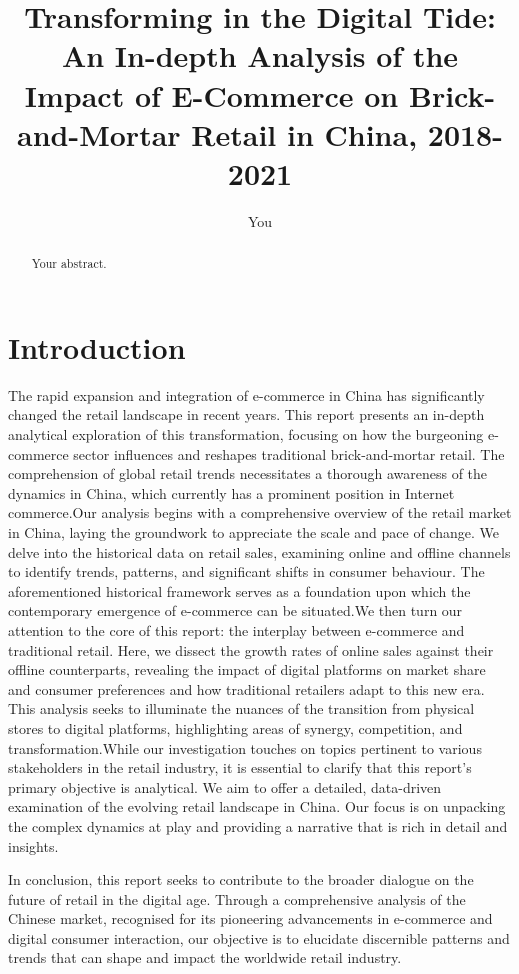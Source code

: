 \documentclass{article}
\title{Transforming in the Digital Tide: An In-depth Analysis of the Impact of E-Commerce on Brick-and-Mortar Retail in China, 2018-2021}
\author{You}
\begin{document}
\maketitle

\begin{abstract}
Your abstract.
\end{abstract}

\section{Introduction}
The rapid expansion and integration of e-commerce in China has significantly changed the retail landscape in recent years. This report presents an in-depth analytical exploration of this transformation, focusing on how the burgeoning e-commerce sector influences and reshapes traditional brick-and-mortar retail. The comprehension of global retail trends necessitates a thorough awareness of the dynamics in China, which currently has a prominent position in Internet commerce.Our analysis begins with a comprehensive overview of the retail market in China, laying the groundwork to appreciate the scale and pace of change. We delve into the historical data on retail sales, examining online and offline channels to identify trends, patterns, and significant shifts in consumer behaviour. The aforementioned historical framework serves as a foundation upon which the contemporary emergence of e-commerce can be situated.We then turn our attention to the core of this report: the interplay between e-commerce and traditional retail. Here, we dissect the growth rates of online sales against their offline counterparts, revealing the impact of digital platforms on market share and consumer preferences and how traditional retailers adapt to this new era. This analysis seeks to illuminate the nuances of the transition from physical stores to digital platforms, highlighting areas of synergy, competition, and transformation.While our investigation touches on topics pertinent to various stakeholders in the retail industry, it is essential to clarify that this report's primary objective is analytical. We aim to offer a detailed, data-driven examination of the evolving retail landscape in China. Our focus is on unpacking the complex dynamics at play and providing a narrative that is rich in detail and insights.

In conclusion, this report seeks to contribute to the broader dialogue on the future of retail in the digital age. Through a comprehensive analysis of the Chinese market, recognised for its pioneering advancements in e-commerce and digital consumer interaction, our objective is to elucidate discernible patterns and trends that can shape and impact the worldwide retail industry.
\end{document}
